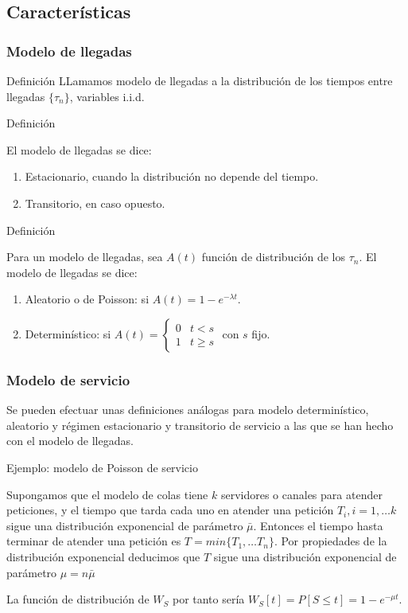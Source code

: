 \documentclass[8pt]{beamer}
\begin{document}
  \subsection{Características}
  \begin{frame}\frametitle{Modelo de llegadas}
    \begin{block}{Definición}
    LLamamos modelo de llegadas a la distribución de los tiempos entre llegadas $\{\tau_n\}$, variables i.i.d.
    \end{block}
    \begin{block}{Definición}

    El modelo de llegadas se dice:
 
    \begin{enumerate}
    \item Estacionario, cuando la distribución no depende del tiempo.
    \item Transitorio, en caso opuesto.
    \end{enumerate}
    \end{block}
    \begin{block}{Definición}

      Para un modelo de llegadas, sea $A(t)$ función de distribución de los $\tau_n$.
      El modelo de llegadas se dice:

      \begin{enumerate}
      \item Aleatorio o de Poisson: si $A(t) = 1 - e^{-\lambda t}$.
      \item Determinístico: si $A(t) = \left\{\begin{array}{ll}
        0 & t<s \\
        1 & t\ge s
      \end{array}\right.$ con $s$ fijo.

      \end{enumerate}
    \end{block}
  \end{frame}
  \begin{frame}\frametitle{Modelo de servicio}
    Se pueden efectuar unas definiciones análogas para modelo determinístico, aleatorio y régimen estacionario y transitorio
    de servicio a las que se han hecho con el modelo de llegadas.

    \begin{block}{Ejemplo: modelo de Poisson de servicio}

      Supongamos que el modelo de colas tiene $k$ servidores o canales para atender peticiones, y el tiempo que 
      tarda cada uno en atender una petición $T_i, i=1,\ldots k$ sigue una distribución exponencial de parámetro $\bar{\mu}$.
      Entonces el tiempo hasta terminar de atender una petición es $T = min\{T_1, \ldots T_n\}$. Por propiedades de la
      distribución exponencial deducimos que $T$ sigue una distribución exponencial de parámetro $\mu = n \bar{\mu}$
      
      La función de distribución de $W_S$ por tanto sería $W_S[t] = P[S\le t] = 1 - e^{-\mu t}$.

    \end{block}


  \end{frame}
\end{document}
